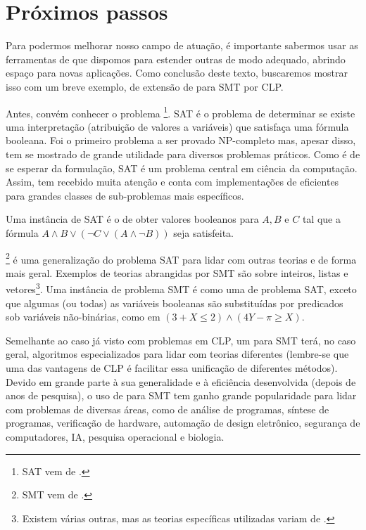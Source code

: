 \documentclass{article}
\begin{document}
\section{Próximos passos}

Para podermos melhorar nosso campo de atuação, é importante sabermos
usar as ferramentas de que dispomos para estender outras de modo
adequado, abrindo espaço para novas aplicações. Como conclusão deste
texto, buscaremos mostrar isso com um breve exemplo, de extensão de
 para SMT por CLP.

Antes, convém conhecer o problema  \footnote{SAT
  vem de .}. SAT é o problema de
determinar se existe uma interpretação (atribuição de
valores  a variáveis) que
satisfaça uma fórmula booleana. Foi o primeiro
problema a ser provado NP-completo\cite{schaefer} mas, apesar disso,
tem se mostrado
de grande utilidade para diversos problemas práticos. Como é de se
esperar da formulação, SAT é um problema central em ciência da
computação. Assim, tem recebido muita atenção e conta com
implementações de  eficientes para grandes classes de
sub-problemas mais específicos.

Uma instância de SAT é o de obter valores booleanos para
$A, B$ e $C$ tal que a fórmula $A \wedge B \vee (\neg C \vee (A \wedge \neg B))$ seja
satisfeita.

\footnote{SMT vem de
  .} é uma generalização do
problema SAT para lidar com outras teorias e de forma mais
geral. Exemplos de teorias abrangidas por SMT são sobre inteiros,
listas e vetores\footnote{Existem várias outras, mas as teorias
  específicas utilizadas variam de .}. Uma instância
de problema SMT é como uma de problema SAT, exceto que algumas (ou
todas) as variáveis booleanas são substituídas por predicados sob
variáveis não-binárias, como em $(3 + X \leq 2) \wedge (4Y - \pi \geq X)$.

Semelhante ao caso já visto com problemas em CLP, um 
para SMT terá, no caso geral, algoritmos especializados para lidar com
teorias diferentes (lembre-se que uma das vantagens de CLP é facilitar
essa unificação de diferentes métodos). Devido em grande parte à sua
generalidade e à eficiência desenvolvida (depois de anos de pesquisa),
o uso de  para SMT tem ganho grande
popularidade para lidar com problemas de diversas áreas, como de
análise de programas\cite{zheng}, síntese de programas\cite{beyene},
verificação de hardware\cite{kroenig}, automação de design
eletrônico\cite{kroenig}, segurança de computadores\cite{vanegue}, IA,
pesquisa operacional\cite{li} e biologia\cite{yordanov}.
\end{document}
